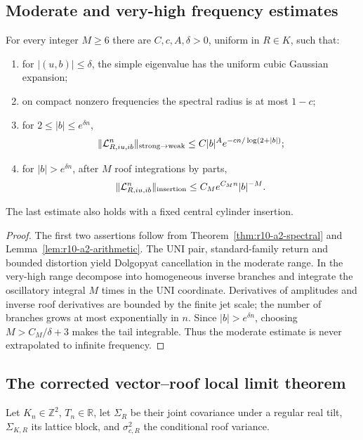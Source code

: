 \subsection{Moderate and very-high frequency estimates}

\begin{theorem}
\label{thm:r10-a2-four-range}
For every integer \(M\ge6\) there are \(C,c,A,\delta>0\), uniform in
\(R\in K\), such that:
\begin{enumerate}[label=(\roman*)]
\item for \(|(u,b)|\le\delta\), the simple eigenvalue has the uniform cubic
      Gaussian expansion;
\item on compact nonzero frequencies the spectral radius is at most \(1-c\);
\item for \(2\le |b|\le e^{\delta n}\),
\[
 \|\mathcal L_{R,iu,ib}^n\|_{\rm strong\to weak}
 \le C|b|^Ae^{-cn/\log(2+|b|)};
\]
\item for \(|b|>e^{\delta n}\), after \(M\) roof integrations by parts,
\[
 \|\mathcal L_{R,iu,ib}^n\|_{\rm insertion}
 \le C_Me^{C_Mn}|b|^{-M}.
\]
\end{enumerate}
The last estimate also holds with a fixed central cylinder insertion.
\end{theorem}

\begin{proof}
The first two assertions follow from
Theorem~\ref{thm:r10-a2-spectral} and
Lemma~\ref{lem:r10-a2-arithmetic}.  The UNI pair, standard-family return and
bounded distortion yield Dolgopyat cancellation in the moderate range.  In
the very-high range decompose into homogeneous inverse branches and integrate
the oscillatory integral \(M\) times in the UNI coordinate.  Derivatives of
amplitudes and inverse roof derivatives are bounded by the finite jet scale;
the number of branches grows at most exponentially in \(n\).  Since
\(|b|>e^{\delta n}\), choosing \(M>C_M/\delta+3\) makes the tail integrable.
Thus the moderate estimate is never extrapolated to infinite frequency.
\end{proof}

\subsection{The corrected vector--roof local limit theorem}

Let \(K_n\in\mathbb Z^2\), \(T_n\in\mathbb R\), let \(\Sigma_R\) be their
joint covariance under a regular real tilt, \(\Sigma_{K,R}\) its lattice
block, and \(\sigma_{c,R}^2\) the conditional roof variance.

